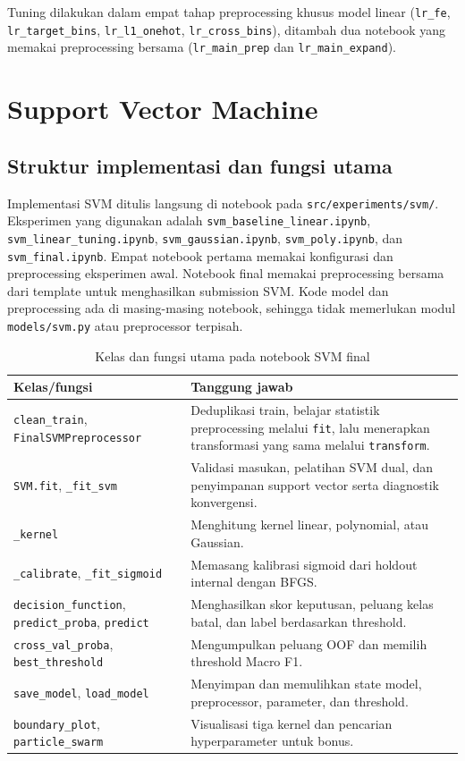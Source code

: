 Tuning dilakukan dalam empat tahap preprocessing khusus model linear (\texttt{lr\_fe}, \texttt{lr\_target\_bins}, \texttt{lr\_l1\_onehot}, \texttt{lr\_cross\_bins}), ditambah dua notebook yang memakai preprocessing bersama (\texttt{lr\_main\_prep} dan \texttt{lr\_main\_expand}).

\section{Support Vector Machine}
\begingroup
\setlength{\emergencystretch}{3em}
\subsection{Struktur implementasi dan fungsi utama}
Implementasi SVM ditulis langsung di notebook pada \texttt{src/experiments/svm/}. Eksperimen yang digunakan adalah \texttt{svm\_baseline\_linear.ipynb}, \texttt{svm\_linear\_tuning.ipynb}, \texttt{svm\_gaussian.ipynb}, \texttt{svm\_poly.ipynb}, dan \texttt{svm\_final.ipynb}. Empat notebook pertama memakai konfigurasi dan preprocessing eksperimen awal. Notebook final memakai preprocessing bersama dari template untuk menghasilkan submission SVM. Kode model dan preprocessing ada di masing-masing notebook, sehingga tidak memerlukan modul \texttt{models/svm.py} atau preprocessor terpisah.

\begin{table}[H]
\centering
\caption{Kelas dan fungsi utama pada notebook SVM final}
\begin{tabularx}{\textwidth}{>{\raggedright\arraybackslash}p{5cm}X}
\toprule
Kelas/fungsi & Tanggung jawab \\
\midrule
\texttt{clean\_train}, \texttt{FinalSVMPreprocessor} & Deduplikasi train, belajar statistik preprocessing melalui \texttt{fit}, lalu menerapkan transformasi yang sama melalui \texttt{transform}. \\
\texttt{SVM.fit}, \texttt{\_fit\_svm} & Validasi masukan, pelatihan SVM dual, dan penyimpanan support vector serta diagnostik konvergensi. \\
\texttt{\_kernel} & Menghitung kernel linear, polynomial, atau Gaussian. \\
\texttt{\_calibrate}, \texttt{\_fit\_sigmoid} & Memasang kalibrasi sigmoid dari holdout internal dengan BFGS. \\
\texttt{decision\_function}, \texttt{predict\_proba}, \texttt{predict} & Menghasilkan skor keputusan, peluang kelas batal, dan label berdasarkan threshold. \\
\texttt{cross\_val\_proba}, \texttt{best\_threshold} & Mengumpulkan peluang OOF dan memilih threshold Macro F1. \\
\texttt{save\_model}, \texttt{load\_model} & Menyimpan dan memulihkan state model, preprocessor, parameter, dan threshold. \\
\texttt{boundary\_plot}, \texttt{particle\_swarm} & Visualisasi tiga kernel dan pencarian hyperparameter untuk bonus. \\
\bottomrule
\end{tabularx}
\end{table}

